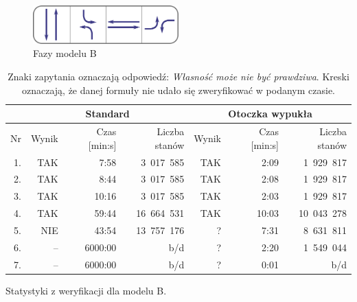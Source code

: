 \documentclass{pracamgr}
\theoremstyle{plain}
\begin{document}
\begin{figure}
  \centering
  \includegraphics[width=0.5\textwidth]{img/ver-b-cycle}
  \caption{Fazy modelu B}
  \label{img:ver-phases-b}
\end{figure}
\begin{table}[ht]
  \centering
  \begin{tabular}{|r||r|r|r||r|r|r||}
    \hline
    & \multicolumn{3}{c||}{\bf Standard} & \multicolumn{3}{c||}{\bf
      Otoczka wypukła} \\ \hline
    Nr   & Wynik & Czas [min:s] & Liczba stanów & Wynik & Czas [min:s] &
    Liczba stanów\\ \hline
    1. & TAK &  7:58 & 3~017~585  & TAK  & 2:09  &  1~929~817 \\
    2. & TAK &  8:44 & 3~017~585  & TAK  & 2:08  &  1~929~817 \\
    3. & TAK & 10:16 & 3~017~585  & TAK  & 2:03  &  1~929~817 \\
    4. & TAK & 59:44 & 16~664~531 & TAK  & 10:03 & 10~043~278 \\
    5. & NIE & 43:54 & 13~757~176 & ?    & 7:31  &  8~631~811 \\
    6. & --  & 6000:00 & b/d            & ?    & 2:20  &  1~549~044 \\
    7. & --  & 6000:00 & b/d         & ?    & 0:01  &       b/d 
    \\\hline
  \end{tabular}
  \caption{Statystyki z weryfikacji dla modelu B.}
  \caption*{Znaki zapytania oznaczają odpowiedź: \emph{Własność może
      nie być prawdziwa}. Kreski oznaczają, że danej formuły nie udało
  się zweryfikować w podanym czasie.}
  \label{tab:ver-stats-b}
\end{table}
\end{document}
